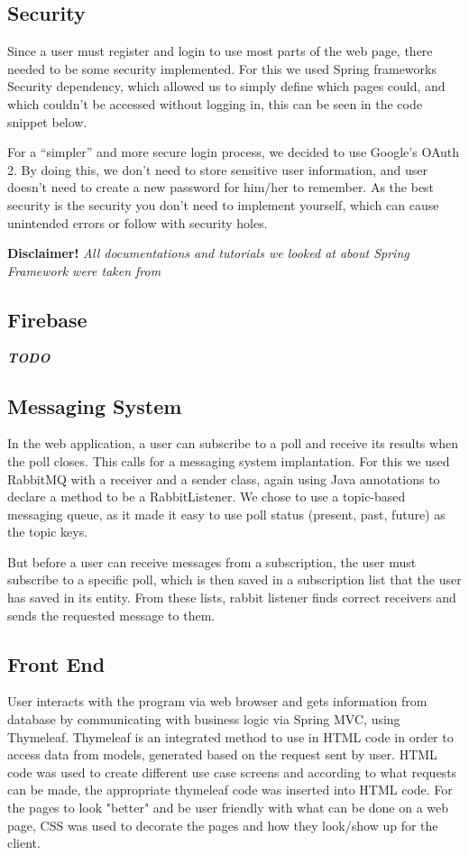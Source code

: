 \subsection{Security}\label{sub:security}
Since a user must register and login to use most parts of the web page, there needed to be some security implemented. For this we used Spring frameworks Security dependency, which allowed us to simply define which pages could, and which couldn't be accessed without logging in, this can be seen in the code snippet below.

For a “simpler” and more secure login process, we decided to use Google's OAuth 2. By doing this, we don't need to store sensitive user information, and user doesn't need to create a new password for him/her to remember. As the best security is the security you don't need to implement yourself, which can cause unintended errors or follow with security holes.



{\footnotesize\textbf{Disclaimer!}\textit{ All documentations and tutorials we looked at about Spring Framework were taken from \cite{spring_Framework}}}

\subsection{Firebase}\label{sub:firebase}
\textbf{\textit{TODO}}

\subsection{Messaging System}\label{sub:messaging}
In the web application, a user can subscribe to a poll and receive its results when the poll closes. This calls for a messaging system implantation. For this we used RabbitMQ with a receiver and a sender class, again using Java annotations to declare a method to be a RabbitListener. We chose to use a topic-based messaging queue, as it made it easy to use poll status (present, past, future) as the topic keys.

But before a user can receive messages from a subscription, the user must subscribe to a specific poll, which is then saved in a subscription list that the user has saved in its entity. From these lists, rabbit listener finds correct receivers and sends the requested message to them. 

\subsection{Front End}\label{sub:frontend}
User interacts with the program via web browser and gets information from database by communicating with business logic via Spring MVC, using Thymeleaf. Thymeleaf is an integrated method to use in HTML code in order to access data from models, generated based on the request sent by user. HTML code was used to create different use case screens and according to what requests can be made, the appropriate thymeleaf code was inserted into HTML code. For the pages to look "better" and be user friendly with what can be done on a web page, CSS was used to decorate the pages and how they look/show up for the client.
